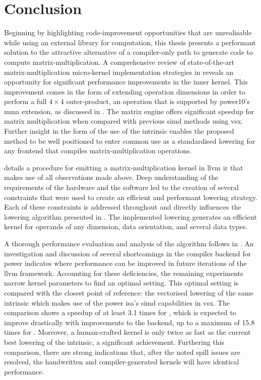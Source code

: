 \documentclass[\main/thesis.tex]{subfiles}
\begin{document}
\chapter{Conclusion}
\label{cha:conclusion}
Beginning by highlighting code-improvement opportunities that are unrealisable while using an external library for computation, this thesis presents a performant solution to the attractive alternative of a compiler-only path to generate code to compute matrix-multiplication.
A comprehensive review of state-of-the-art matrix-multiplication micro-kernel implementation strategies in  reveals an opportunity for significant performance improvements in the inner kernel.
This improvement comes in the form of extending operation dimensions in order to perform a full $4 \times 4$ outer-product, an operation that is supported by \gls{power10}'s \gls{mma} extension, as discussed in .
The \gls{matrix engine} offers significant speedup for matrix multiplication when compared with previous \gls{simd} methods using \gls{vsx}.
Further insight in the form of the use of the  \gls{intrinsic} enables the proposed method to be well positioned to enter common use as a standardised \gls{lowering} for any frontend that compiles matrix-multiplication operations.

 details a procedure for emitting a matrix-multiplication kernel in \gls{llvm} \gls{ir} that makes use of all observations made above.
Deep understanding of the requirements of the hardware and the software led to the creation of several constraints that were used to create an efficient and performant \gls{lowering} strategy.
Each of these constraints is addressed throughout  and directly influences the \gls{lowering} algorithm presented in .
The implemented lowering generates an efficient kernel for operands of any dimension, data orientation, and several data types.

A thorough performance evaluation and analysis of the algorithm follows in .
An investigation and discussion of several shortcomings in the compiler backend for \gls{power} indicates where performance can be improved in future iterations of the \gls{llvm} framework.
Accounting for these deficiencies, the remaining experiments narrow kernel parameters to find an optimal setting.
This optimal setting is compared with the closest point of reference: the vectorised lowering of the same \gls{intrinsic} which makes use of the \gls{power} \gls{isa}'s \gls{simd} capabilities in \gls{vsx}.
The comparison shows a speedup of at least 3.1 times for , which is expected to improve drastically with improvements to the backend, up to a maximum of 15.8 times for .
Moreover, a human-crafted kernel is only twice as fast as the current best \gls{lowering} of the  \gls{intrinsic}, a significant achievement.
Furthering this comparison, there are strong indications that, after the noted \gls{spill} issues are resolved, the handwritten and compiler-generated kernels will have identical performance.
\end{document}
